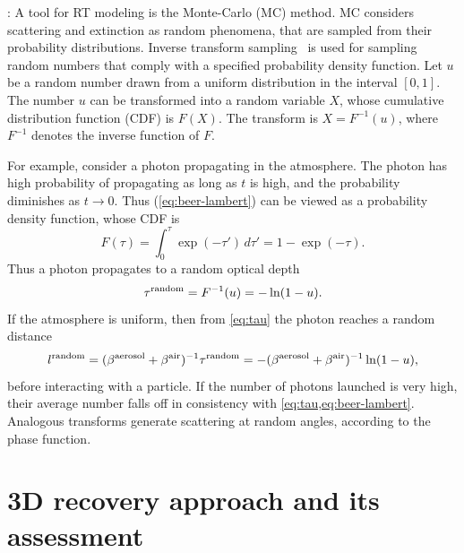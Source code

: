 \documentclass[10pt,letterpaper]{article}
\newcommand{\derivsym}[1]{\,d{#1}}
\begin{document}
: A tool for RT modeling is
the Monte-Carlo (MC) method. MC considers scattering and extinction as
random phenomena, that are sampled from their probability
distributions.
Inverse transform sampling~\cite{devroye1986sample} is used for
sampling random numbers that comply with a specified
probability density function. Let $u$ be a random number drawn
from a uniform distribution in the interval $[0,1]$. The number $u$
can be transformed into a random variable $X$, whose cumulative
distribution function (CDF) is $F(X)$. The transform is $X =
F^{-1}(u)$, where $F^{-1}$ denotes the inverse function of $F$.

For example, consider a photon propagating in the atmosphere.  The
photon has high probability of propagating as long as $t$ is high, and
the probability diminishes as $t\rightarrow 0$. Thus
(\cref{eq:beer-lambert}) can be viewed as a probability density
function, whose CDF is
\begin{equation}
  \label{eq:Ftau}
  F(\tau)=\int_{0}^{\tau}\exp(-\tau')\derivsym{\tau'}=1-\exp(-\tau).
\end{equation}
Thus a photon propagates to a random optical depth
\begin{equation}
  \label{eq:taurand}
  \tau^{\rm random}=F^{-1}(u)=-\ln(1-u).
\end{equation}
If the atmosphere is uniform, then from \cref{eq:tau} the photon
reaches a random distance
\begin{equation}
  \label{eq:lrand}
  l^{\rm random}= (\beta^{\rm aerosol}+\beta^{\rm air})^{-1} \tau^{\rm random}
  = -(\beta^{\rm aerosol}+\beta^{\rm air})^{-1}\ln(1-u),
\end{equation}
before interacting with a particle. If the number of photons launched
is very high, their average number falls off in consistency with
\cref{eq:tau,eq:beer-lambert}.  Analogous transforms
generate scattering at random angles, according to the phase function.


\section{3D recovery approach and its assessment}
\label{sec:methodology}
\end{document}
